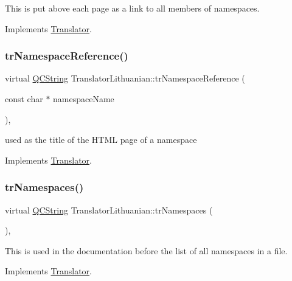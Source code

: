 This is put above each page as a link to all members of namespaces. 

Implements \mbox{\hyperlink{class_translator}{Translator}}.

\mbox{\label{class_translator_lithuanian_a77635c787bf4aae4c46c62a91d5ef0ee}} 
\subsubsection{\texorpdfstring{trNamespaceReference()}{trNamespaceReference()}}
{\footnotesize\ttfamily virtual \mbox{\hyperlink{class_q_c_string}{Q\+C\+String}} Translator\+Lithuanian\+::tr\+Namespace\+Reference (\begin{DoxyParamCaption}\item[{const char $\ast$}]{namespace\+Name }\end{DoxyParamCaption})\hspace{0.3cm}{\ttfamily [inline]}, {\ttfamily [virtual]}}

used as the title of the H\+T\+ML page of a namespace 

Implements \mbox{\hyperlink{class_translator}{Translator}}.

\mbox{\label{class_translator_lithuanian_a967b4263adafd5ee05aa83945d99c3e0}} 
\subsubsection{\texorpdfstring{trNamespaces()}{trNamespaces()}}
{\footnotesize\ttfamily virtual \mbox{\hyperlink{class_q_c_string}{Q\+C\+String}} Translator\+Lithuanian\+::tr\+Namespaces (\begin{DoxyParamCaption}{ }\end{DoxyParamCaption})\hspace{0.3cm}{\ttfamily [inline]}, {\ttfamily [virtual]}}

This is used in the documentation before the list of all namespaces in a file. 

Implements \mbox{\hyperlink{class_translator}{Translator}}.

